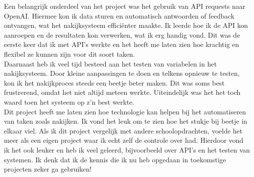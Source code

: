 \documentclass[12pt]{article}
\begin{document}
\begin{multicols}{2}
\begin{minipage}{\linewidth}
Een belangrijk onderdeel van het project was het gebruik van API requests naar OpenAI.
Hiermee kon ik data sturen en automatisch antwoorden of feedback ontvangen, wat het nakijksysteem efficiënter maakte.
Ik leerde hoe ik de API kon aanroepen en de resultaten kon verwerken, wat ik erg handig vond. Dit was de eerste keer dat ik met API’s werkte 
en het heeft me laten zien hoe krachtig en flexibel ze kunnen zijn voor dit soort taken.\\

Daarnaast heb ik veel tijd besteed aan het testen van variabelen in het nakijksysteem.
Door kleine aanpassingen te doen en telkens opnieuw te testen, kon ik het nakijkproces steeds een beetje beter maken.
Dit was soms best frustrerend, omdat het niet altijd meteen werkte.
Uiteindelijk was het het toch waard toen het systeem op z'n best werkte.\\

Dit project heeft me laten zien hoe technologie kan helpen bij het automatiseren van taken zoals nakijken.
Ik vond het leuk om te zien hoe het stukje bij beetje in elkaar viel.
Als ik dit project vergelijk met andere schoolopdrachten, voelde het meer als een eigen project waar ik echt zelf de controle over had.
Hierdoor vond ik het ook leuker en heb ik veel geleerd, bijvoorbeeld over API’s en het testen van systemen.
Ik denk dat ik de kennis die ik nu heb opgedaan in toekomstige projecten zeker ga gebruiken!
\end{minipage}

\end{multicols}
\end{document}
